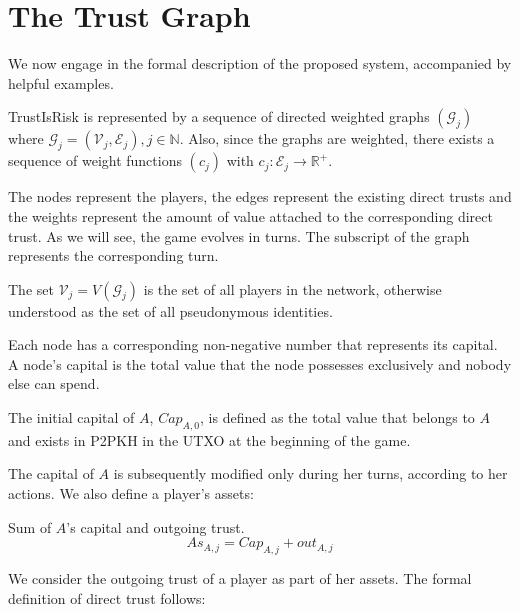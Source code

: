 \documentclass[11pt]{llncs}
\theoremstyle{definition}
\begin{document}
  \section{The Trust Graph}
     We now engage in the formal description of the proposed system, accompanied by helpful examples.
     \begin{definition}[Graph]
        TrustIsRisk is represented by a sequence of directed weighted graphs $\left(\mathcal{G}_j\right)$ where $\mathcal{G}_j
        = \left(\mathcal{V}_j, \mathcal{E}_j\right), j \in \mathbb{N}$.
        Also, since the graphs are weighted, there exists a sequence of weight functions $\left(c_j\right)$ with $c_j :
        \mathcal{E}_j \rightarrow \mathbb{R}^{+}$.
     \end{definition}
     The nodes represent the players, the edges represent the existing direct trusts and the weights represent the amount of
     value attached to the corresponding direct trust. As we will see, the game evolves in turns. The subscript of the graph
     represents the corresponding turn.
     \begin{definition}[Players]
        The set $\mathcal{V}_j = V\left(\mathcal{G}_j\right)$ is the set of all players in the network, otherwise understood
        as the set of all pseudonymous identities.
     \end{definition}
     Each node has a corresponding non-negative number that represents its capital. A node's capital is the total value that
     the node possesses exclusively and nobody else can spend.
     \begin{definition}[Capital]
        The initial capital of $A$, $Cap_{A, 0}$, is defined as the total value that belongs to $A$ and exists in P2PKH in
        the UTXO at the beginning of the game.
     \end{definition}
     The capital of $A$ is subsequently modified only during her turns, according to her actions. We also define a player's
     assets:
     \begin{definition}[Assets]
        Sum of $A$'s capital and outgoing trust.
        \begin{equation}
           As_{A, j} = Cap_{A, j} + out_{A, j}
        \end{equation}
     \end{definition}
     We consider the outgoing trust of a player as part of her assets. The formal definition of direct trust follows:
\end{document}
